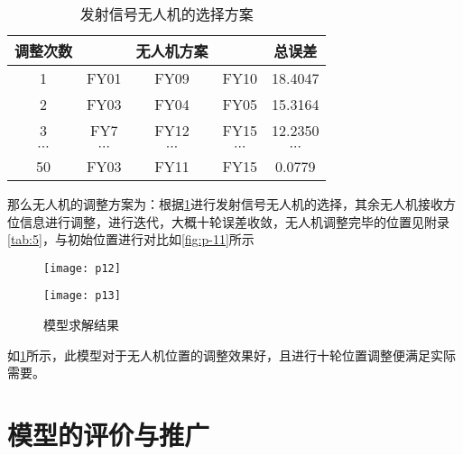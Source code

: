 \documentclass{cumcmthesis}
\begin{document}
\begin{table}[H]
	\caption{发射信号无人机的选择方案}\label{tab:b} \centering
	\begin{tabular}{ccccc}
		\toprule[1.5pt]
		调整次数 &  & 无人机方案 &  & 总误差 \\
		\midrule[1pt]
		1 & FY01 & FY09 & FY10 & 18.4047
		\\
		2 & FY03 & FY04 & FY05 & 15.3164
		\\
		3 & FY7 & FY12 & FY15 & 12.2350
		\\ 
		$\cdots$ & $\cdots$ & $\cdots$ & $\cdots$ & $\cdots$ \\
		50 & FY03 & FY11 & FY15 & 0.0779
		\\
		\bottomrule[1.5pt]
	\end{tabular}
\end{table}	
那么无人机的调整方案为：根据\cref{tab:b}进行发射信号无人机的选择，其余无人机接收方位信息进行调整，进行迭代，大概十轮误差收敛，无人机调整完毕的位置见附录\cref{tab:5}，与初始位置进行对比如\cref{fig:p-11}所示

\begin{figure}
	\centering
	\begin{minipage}[c]{0.48\textwidth}
		\centering
		\texttt{[image: p12]}
		\label{fig:p-11}
	\end{minipage}
	\begin{minipage}[c]{0.48\textwidth}
		\centering
		\texttt{[image: p13]}
		\label{fig:p-12}
	\end{minipage}
	
	\caption{模型求解结果}
\end{figure}

如\cref{fig:p-12}所示，此模型对于无人机位置的调整效果好，且进行十轮位置调整便满足实际需要。

\section{模型的评价与推广}
\end{document}
